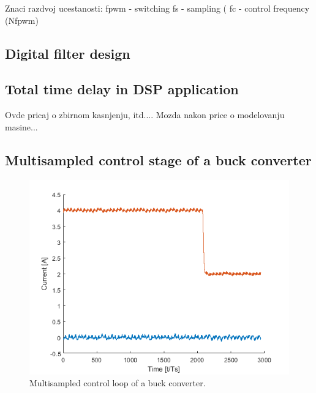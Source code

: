 \documentclass[journal]{IEEEtran}
\begin{document}
Znaci razdvoj ucestanosti:
fpwm - switching
fs - sampling (
fc - control frequency (Nfpwm)

\subsection{Digital filter design}

\subsection{Total time delay in DSP application}
Ovde pricaj o zbirnom kasnjenju, itd....
Mozda nakon price o modelovanju masine...

\subsection{Multisampled control stage of a buck converter}

\begin{figure}[t!]
    \centerline{\includegraphics[width=0.95\linewidth]{figures/nas_step.png}}
    \caption{Multisampled control loop of a buck converter.}
    \label{fig:MSControl}
\end{figure}
\end{document}
